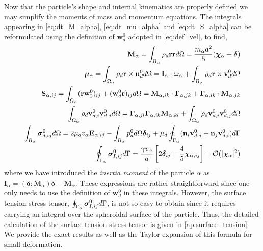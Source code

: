 Now that the particle's shape and internal kinematics   are properly defined we may simplify the moments of mass and momentum equations. 
The integrals appearing in \ref{eq:dt_M_alpha}, \ref{eq:dt_mu_alpha} and \ref{eq:dt_S_alpha} can be reformulated using the definition of $\textbf{w}_d^0$ adopted in \ref{eq:def_vel}, to find, 
\begin{align}
    \textbf{M}_\alpha 
    = \intO{ \rho_d \textbf{rr} }
    = \frac{m_\alpha a^2}{5} (\bm\chi_\alpha+\bm\delta)\\
    \bm\mu_\alpha 
    = \intO{ \rho_d \textbf{r}\times\textbf{u}_d^0 }
    = \textbf{I}_\alpha \cdot \bm\omega_\alpha
    + \intO{ \rho_d \textbf{r}\times\textbf{v}_d^0 }
    \\
    \label{eq:S_def}
    \textbf{S}_{\alpha,ij} = \intO{(\textbf{rw}_ 2^0 )_{ij}+ (\textbf{w}_d^0 \textbf{r})_{ij}} 
    = \textbf{M}_{\alpha,ik} \cdot \bm\Gamma_{\alpha,jk}
        +  \bm\Gamma_{\alpha,ik} \cdot \textbf{M}_{\alpha,jk}
    \\
    \intO{\rho_d \textbf{v}_{d,i}^0\textbf{v}_{d,j}^0}
    = \bm\Gamma_{\alpha,jl}\bm\Gamma_{\alpha,ik} \textbf{M}_{\alpha,kl}  
    +\intO{\rho_d \textbf{v}_{d,i}^0\textbf{v}_{d,j}^0}
    \label{eq:ww_def}
    \\
    \label{eq:sigma_d_def}
    \intO{\bm\sigma_{d,ij}^0}
    =
    2 \mu_d v_\alpha \textbf{E}_{\alpha,ij}
    - \intO{p_d^0} \bm\delta_{ij}
    + \mu_d \intS{(\textbf{n}_i \textbf{v}_{d,j}^0 + \textbf{n}_j \textbf{v}_{d,i}^0)}
    \\
    \intS{\bm\sigma_{I,ij}^0}
    = \frac{\gamma v_\alpha }{a} \left[
        2\bm\delta_{ij} 
        + \frac{4  }{5} \bm\chi_{\alpha,ij}
    \right]
    +\mathcal{O}(|\bm\chi_\alpha|^2)
\end{align}
where we have introduced the \textit{inertia moment} of the particle $\alpha$ as $\textbf{I}_\alpha = (\bm\delta : \textbf{M}_\alpha)\bm\delta - \textbf{M}_\alpha$. 
These expressions are rather straightforward since one only needs to use the definition of $\textbf{w}_d^0$ in these integrals. 
However, the surface tension stress tensor, $\oint_{\Gamma_{\alpha}} \bm\sigma_{I,ij}^0 d\Gamma$, is not so easy to obtain since it requires carrying an integral over the spheroidal surface of the particle.
Thus, the detailed calculation of the surface tension stress tensor is given in \ref{ap:surface_tension}. 
We provide the exact results as well as the Taylor expansion of this formula for small deformation. 
